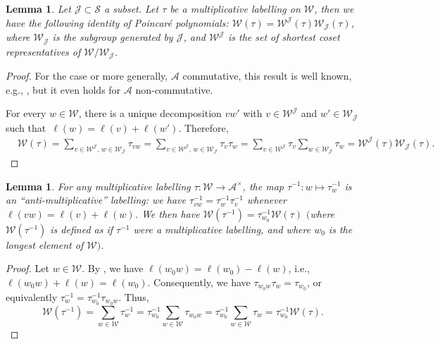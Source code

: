 \documentclass[pdftex]{sigma}
\newtheorem{Lemma}[Theorem]{Lemma}
\theoremstyle{definition}
\numberwithin{equation}{section}
\begin{document}
\begin{Lemma}\label{sec:lem-decompose-poincare}
 Let $\mathcal{J}\subset\mathcal{S}$ a subset. Let $\tau$ be a
 multiplicative labelling on $\mathcal{W}$, then we have the following identity of Poincar\'e polynomials:
$
 \mathcal{W}(\tau) = \mathcal{W}^{\mathcal{J}}(\tau) \mathcal{W}_{\mathcal{J}}(\tau)$,
 where $\mathcal{W}_{\mathcal{J}}$ is the subgroup generated by $\mathcal{J}$, and $\mathcal{W}^{\mathcal{J}}$ is the set of shortest coset representatives of $\mathcal{W}/\mathcal{W}_{\mathcal{J}}$.
\end{Lemma}
\begin{proof}
 For the case  or more generally, $\mathcal{A}$
 commutative, this result is well known, e.g., \cite[Section~5.12]{humphreysRefl}, but it even holds for $\mathcal{A}$ non-commutative.

 For every $w\in\mathcal{W}$, there is a unique decomposition $vw'$ with
 $v\in \mathcal{W}^{\mathcal{J}}$ and $w'\in \mathcal{W}_{\mathcal{J}}$ such that~${\ell(w)=\ell(v)+\ell(w')}$. Therefore,
 \begin{align*}
& \mathcal{W}(\tau)= \sum_{v\in \mathcal{W}^{\mathcal{J}},\, w\in \mathcal{W}_{\mathcal{J}}}
 \tau_{vw} = \sum_{v\in \mathcal{W}^{\mathcal{J}},\, w\in \mathcal{W}_{\mathcal{J}}}
 \tau_v \tau_w= \sum_{v\in \mathcal{W}^{\mathcal{J}}} \tau_v \sum_{w\in \mathcal{W}_{\mathcal{J}}} \tau_w
 = \mathcal{W}^{\mathcal{J}}(\tau) \mathcal{W}_{\mathcal{J}}(\tau).\tag*{\qed}
 \end{align*} \renewcommand{\qed}{}
\end{proof}

\begin{Lemma}\label{sec:lem-inverse-labelling}
 For any multiplicative labelling $\tau\colon \mathcal{W}\to \mathcal{A}^\times$, the map $\tau^{-1}\colon w\mapsto \tau_w^{-1}$ is an
``anti-multiplicative'' labelling: we have $\tau_{vw}^{-1} = \tau_w^{-1}\tau_v^{-1}$ whenever $\ell(vw)=\ell(v)+\ell(w)$.
 We then have
$
 \mathcal{W}(\tau^{-1}) = \tau_{w_0}^{-1} \mathcal{W}(\tau)
$
$($where $\mathcal{W}(\tau^{-1})$ is defined as if $\tau^{-1}$ were a multiplicative labelling,
 and where $w_0$ is the longest element of $\mathcal{W})$.
\end{Lemma}
\begin{proof}
 Let $w\in \mathcal{W}$. By \cite[Corollary~1.8]{humphreysRefl}, we have
 $\ell(w_0w)=\ell(w_0)-\ell(w)$, i.e., $\ell(w_0w)+\ell(w)=\ell(w_0)$.
 Consequently, we have $\tau_{w_0w}\tau_w=\tau_{w_0}$, or
 equivalently
 $\tau_w^{-1}=\tau_{w_0}^{-1}\tau_{w_0w}$.
 Thus,
 \[
 \mathcal{W}(\tau^{-1}) = \sum_{w\in\mathcal{W}} \tau_w^{-1}
 = \tau_{w_0}^{-1}\sum_{w\in\mathcal{W}} \tau_{w_0w}
 = \tau_{w_0}^{-1}\sum_{w\in\mathcal{W}} \tau_w
 = \tau_{w_0}^{-1} \mathcal{W}(\tau).\tag*{\qed}
 \]\renewcommand{\qed}{}
\end{proof}
\end{document}
